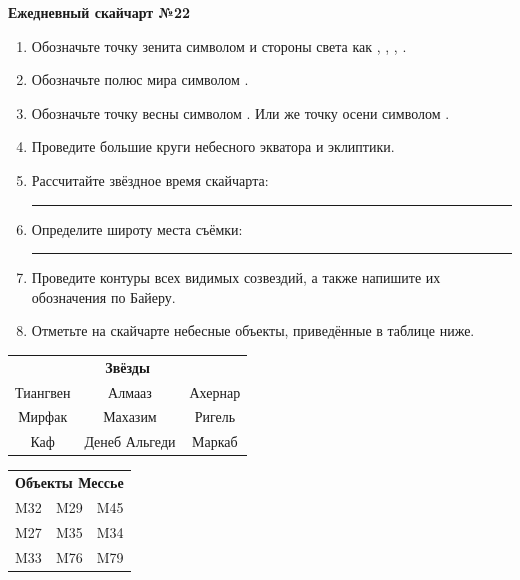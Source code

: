 \documentclass{./SAS-class-skygen}
\begin{document}
    
    
    
	\begin{center}
		\large\textbf{Ежедневный скайчарт №22}
	\end{center}

	\begin{enumerate}
		\item Обозначьте точку зенита символом  и стороны света как , , , .
		\item Обозначьте полюс мира символом .
		\item Обозначьте точку весны символом \Aries. Или же точку осени символом \Libra.
		\item Проведите большие круги небесного экватора и эклиптики.
		\item Рассчитайте звёздное время скайчарта: \rule{2cm}{0.4pt}
		\item Определите широту места съёмки: \rule{2cm}{0.4pt}
		\item Проведите контуры всех видимых созвездий, а также напишите их обозначения по Байеру.
		\item Отметьте на скайчарте небесные объекты, приведённые в таблице ниже.
	\end{enumerate}
	
    \vspace{0.5cm}

    \begin{table}[h!]
    \centering
    \begin{tabular}{ccc}
    \multicolumn{3}{c}{\textbf{Звёзды}} \\ Тиангвен & Алмааз & Ахернар \\
Мирфак & Махазим & Ригель \\
Каф & Денеб Альгеди & Маркаб \\

\end{tabular}
    \hfill
    \begin{tabular}{ccc}
    \multicolumn{3}{c}{\textbf{Объекты Мессье}} \\ M32 & M29 & M45 \\
M27 & M35 & M34 \\
M33 & M76 & M79 \\

\end{tabular}
    \end{table}
	
\end{document}
